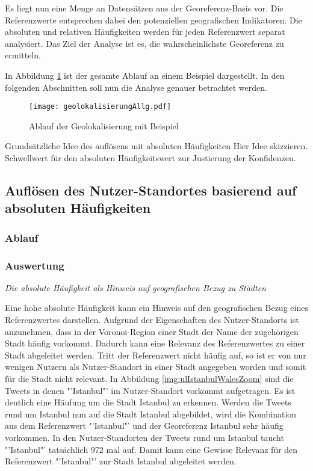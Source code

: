 			Es liegt nun eine Menge an Datensätzen aus der Georeferenz-Basis vor.
			Die Referenzwerte entsprechen dabei den potenziellen geografischen Indikatoren.
			Die absoluten und relativen Häufigkeiten werden für jeden Referenzwert separat analysiert.
			Das Ziel der Analyse ist es, die wahrscheinlichste Georeferenz zu ermitteln.

			In Abbildung \ref{img:ablaufGeolok} ist der gesamte Ablauf an einem Beispiel dargestellt.
			In den folgenden Abschnitten soll nun die Analyse genauer betrachtet werden.

				\begin{figure} 
				\begin{center}
							\texttt{[image: geolokalisierungAllg.pdf]}
							\caption{Ablauf der Geolokalisierung mit Beispiel}
							\label{img:ablaufGeolok}
						\end{center}
				\end{figure}	

			Grundsätzliche Idee des auflösens mit absoluten Häufigkeiten
			Hier Idee skizzieren. 
			Schwellwert für den absoluten Häufigkeitswert zur Justierung der Konfidenzen.

		\subsection{Auflösen des Nutzer-Standortes basierend auf absoluten Häufigkeiten} 


			\subsubsection{Ablauf}

			\subsubsection{Auswertung}  

				\textit{Die absolute Häufigkeit als Hinweis auf geografischen Bezug zu Städten} 
				
				Eine hohe absolute Häufigkeit kann ein Hinweis auf den geografischen Bezug eines Referenzwertes darstellen. 
				Aufgrund der Eigenschaften des Nutzer-Standorts ist anzunehmen, dass in der Voronoi-Region einer Stadt der Name der zugehörigen Stadt häufig vorkommt.
				Dadurch kann eine Relevanz des Referenzwertes zu einer Stadt abgeleitet werden. 
				Tritt der Referenzwert nicht häufig auf, so ist er von nur wenigen Nutzern als Nutzer-Standort in einer Stadt angegeben worden und somit für die Stadt nicht relevant.
				In Abbildung \ref{img:ulIstanbulWalesZoom} sind die Tweets in denen "'Istanbul"' im Nutzer-Standort vorkommt aufgetragen.
				Es ist deutlich eine Häufung um die Stadt Istanbul zu erkennen. 
				Werden die Tweets rund um Istanbul nun auf die Stadt Istanbul abgebildet, wird die Kombination aus dem Referenzwert "'Istanbul"' und der Georeferenz Istanbul sehr häufig vorkommen.
				In den Nutzer-Standorten der Tweets rund um Istanbul taucht "'Istanbul"' tatsächlich 972 mal auf.
				Damit kann eine Gewisse Relevanz für den Referenzwert "'Istanbul"' zur Stadt Istanbul abgeleitet werden.

